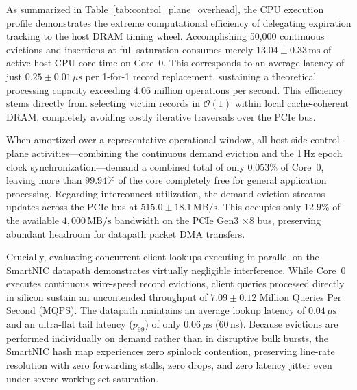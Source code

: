 \documentclass[a4paper,fleqn,colorlinks,hidelinks]{cas-sc}
\begin{document}
As summarized in Table~\ref{tab:control_plane_overhead}, the CPU execution profile demonstrates the extreme computational efficiency of delegating expiration tracking to the host DRAM timing wheel. Accomplishing 50,000 continuous evictions and insertions at full saturation consumes merely $13.04 \pm 0.33\,\text{ms}$ of active host CPU core time on Core~0. This corresponds to an average latency of just $0.25 \pm 0.01\,\mu\text{s}$ per 1-for-1 record replacement, sustaining a theoretical processing capacity exceeding 4.06 million operations per second. This efficiency stems directly from selecting victim records in $\mathcal{O}(1)$ within local cache-coherent DRAM, completely avoiding costly iterative traversals over the PCIe bus. 

When amortized over a representative operational window, all host-side control-plane activities---combining the continuous demand eviction and the 1\,Hz epoch clock synchronization---demand a combined total of only $0.053\%$ of Core~0, leaving more than $99.94\%$ of the core completely free for general application processing. Regarding interconnect utilization, the demand eviction streams updates across the PCIe bus at $515.0 \pm 18.1\,\text{MB/s}$. This occupies only $12.9\%$ of the available $4{,}000\,\text{MB/s}$ bandwidth on the PCIe Gen3 $\times8$ bus, preserving abundant headroom for datapath packet DMA transfers.

Crucially, evaluating concurrent client lookups executing in parallel on the SmartNIC datapath demonstrates virtually negligible interference. While Core~0 executes continuous wire-speed record evictions, client queries processed directly in silicon sustain an uncontended throughput of $7.09 \pm 0.12$ Million Queries Per Second (MQPS). The datapath maintains an average lookup latency of $0.04\,\mu\text{s}$ and an ultra-flat tail latency ($p_{99}$) of only $0.06\,\mu\text{s}$ ($60$\,ns). Because evictions are performed individually on demand rather than in disruptive bulk bursts, the SmartNIC hash map experiences zero spinlock contention, preserving line-rate resolution with zero forwarding stalls, zero drops, and zero latency jitter even under severe working-set saturation.
\end{document}
